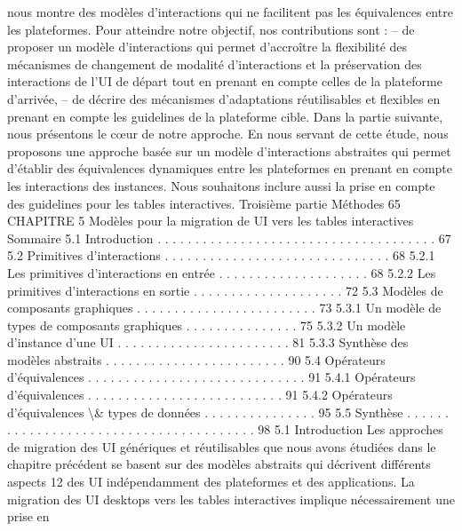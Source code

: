 \documentclass{article}
\begin{document}
nous montre des mod\`{e}les d’interactions qui ne facilitent pas les \'{e}quivalences entre les plateformes.
Pour atteindre notre objectif, nos contributions sont :
– de proposer un mod\`{e}le d’interactions qui permet d’accro\^{i}tre la ﬂexibilit\'{e} des m\'{e}canismes de
changement de modalit\'{e} d’interactions et la pr\'{e}servation des interactions de l’UI de d\'{e}part tout
en prenant en compte celles de la plateforme d’arriv\'{e}e,
– de d\'{e}crire des m\'{e}canismes d’adaptations r\'{e}utilisables et ﬂexibles en prenant en compte les
guidelines de la plateforme cible.
Dans la partie suivante, nous pr\'{e}sentons le cœur de notre approche. En nous servant de cette \'{e}tude,
nous proposons une approche bas\'{e}e sur un mod\`{e}le d’interactions abstraites qui permet d’\'{e}tablir des
\'{e}quivalences dynamiques entre les plateformes en prenant en compte les interactions des instances.
Nous souhaitons inclure aussi la prise en compte des guidelines pour les tables interactives.
Troisi\`{e}me partie
M\'{e}thodes
65
CHAPITRE 5
Mod\`{e}les pour la migration de UI vers les
tables interactives
Sommaire
5.1
Introduction . . . . . . . . . . . . . . . . . . . . . . . . . . . . . . . . . . . . .
67
5.2
Primitives d’interactions
. . . . . . . . . . . . . . . . . . . . . . . . . . . . . .
68
5.2.1
Les primitives d’interactions en entr\'{e}e . . . . . . . . . . . . . . . . . . . .
68
5.2.2
Les primitives d’interactions en sortie . . . . . . . . . . . . . . . . . . . .
72
5.3
Mod\`{e}les de composants graphiques
. . . . . . . . . . . . . . . . . . . . . . . .
73
5.3.1
Un mod\`{e}le de types de composants graphiques . . . . . . . . . . . . . . .
75
5.3.2
Un mod\`{e}le d’instance d’une UI
. . . . . . . . . . . . . . . . . . . . . . .
81
5.3.3
Synth\`{e}se des mod\`{e}les abstraits . . . . . . . . . . . . . . . . . . . . . . . .
90
5.4
Op\'{e}rateurs d’\'{e}quivalences
. . . . . . . . . . . . . . . . . . . . . . . . . . . . .
91
5.4.1
Op\'{e}rateurs d’\'{e}quivalences . . . . . . . . . . . . . . . . . . . . . . . . . .
91
5.4.2
Op\'{e}rateurs d’\'{e}quivalences \textbackslash{}& types de donn\'{e}es . . . . . . . . . . . . . . .
95
5.5
Synth\`{e}se
. . . . . . . . . . . . . . . . . . . . . . . . . . . . . . . . . . . . . . .
98
5.1
Introduction
Les approches de migration des UI g\'{e}n\'{e}riques et r\'{e}utilisables que nous avons \'{e}tudi\'{e}es dans le
chapitre pr\'{e}c\'{e}dent se basent sur des mod\`{e}les abstraits qui d\'{e}crivent diff\'{e}rents aspects 12 des UI ind\'{e}pendamment des plateformes et des applications.
La migration des UI desktops vers les tables interactives implique n\'{e}cessairement une prise en
\end{document}
